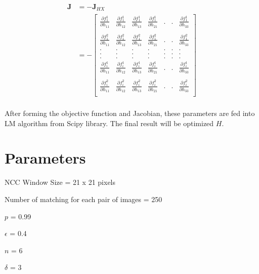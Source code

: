 \documentclass[11pt]{article}
\begin{document}
\begin{align*}
\mathbf{J} &= - \mathbf{J}_{HX} \\
&= - \begin{bmatrix} 
\frac{\partial f^1_1}{\partial h_{11}} & \frac{\partial f^1_1}{\partial h_{12}} & \frac{\partial f^1_1}{\partial h_{13}}  & \frac{\partial f^1_1}{\partial h_{21}} & . & . & \frac{\partial f^1_1}{\partial h_{33}} \\\\
\frac{\partial f^2_1}{\partial h_{11}} & \frac{\partial f^2_1}{\partial h_{12}} & \frac{\partial f^2_1}{\partial h_{13}}  & \frac{\partial f^2_1}{\partial h_{21}} & . & . & \frac{\partial f^2_1}{\partial h_{33}} \\
. & . & .  & . & . & . & . \\
. & . & .  & . & . & . & . \\
. & . & .  & . & . & . & . \\
\frac{\partial f^1_i}{\partial h_{11}} & \frac{\partial f^1_i}{\partial h_{12}} & \frac{\partial f^1_i}{\partial h_{13}}  & \frac{\partial f^1_i}{\partial h_{21}} & . & . & \frac{\partial f^1_i}{\partial h_{33}} \\\\
\frac{\partial f^2_i}{\partial h_{11}} & \frac{\partial f^2_i}{\partial h_{12}} & \frac{\partial f^2_i}{\partial h_{13}}  & \frac{\partial f^2_i}{\partial h_{21}} & . & . & \frac{\partial f^2_i}{\partial h_{33}} \\
\end{bmatrix} \\
\end{align*}

After forming the objective function and Jacobian, these parameters are fed into LM algorithm from Scipy library. The final result will be optimized $H$. 

\section*{Parameters}

NCC Window Size = 21 x 21 pixels

Number of matching for each pair of images = 250

$p$ = 0.99

$\epsilon$ = 0.4

$n$ = 6

$\delta$ = 3

\end{document}

